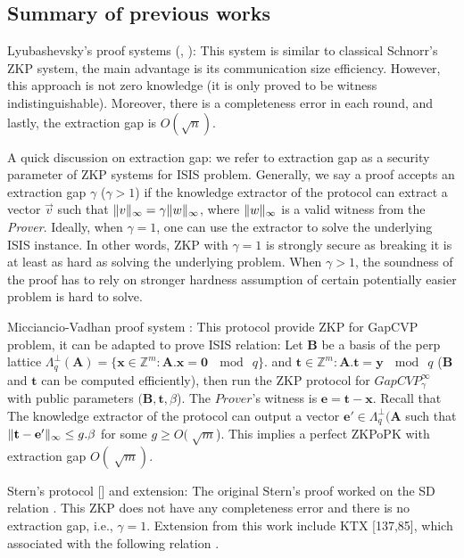 \subsection*{Summary of previous works}
\begin{description}
\item Lyubashevsky's proof systems (\cite{lyubashevsky2008lattice},
  \cite{lyubashevsky2009fiat}): This system is similar to classical Schnorr's
  ZKP system, the main advantage is its communication size efficiency. However,
  this approach is not zero knowledge (it is only proved to be witness
  indistinguishable). Moreover, there is a completeness error in each round, and
  lastly, the extraction gap is $O(\sqrt{n})$.

  A quick discussion on extraction gap: we refer to extraction gap as a security
  parameter of ZKP systems for ISIS problem. Generally, we say a proof accepts
  an extraction gap $\gamma$ ($\gamma > 1$) if the knowledge extractor of the
  protocol can extract a vector $\vec{v}$ such that
  $\Vert v \Vert_{\infty} = \gamma \Vert w \Vert_{\infty}$, where $\Vert w \Vert_{\infty}$ is a valid witness
  from the \emph{Prover}. Ideally, when $\gamma = 1$, one can use the extractor
  to solve the underlying ISIS instance. In other words, ZKP with $\gamma = 1$
  is strongly secure as breaking it is at least as hard as solving the
  underlying problem. When $\gamma > 1$, the soundness of the proof has to rely
  on stronger hardness assumption of certain potentially easier problem is hard
  to solve.
\item Micciancio-Vadhan proof system \cite{micciancio2003statistical}: This
  protocol provide ZKP for GapCVP problem, it can be adapted to prove ISIS
  relation: Let $\mathbf{B}$ be a basis of the perp lattice
  $\Lambda_q^\bot(\mathbf{A}) = \{\mathbf{x} \in \mathbb{Z}^m: \mathbf{A.x = 0}\
  \mod \ q\}$.  and $\mathbf{t} \in \mathbb{Z}^m: \mathbf{A.t = y}\ \mod \ q$
  ($\mathbf{B}$ and $\mathbf{t}$ can be computed efficiently), then run the ZKP
  protocol for $GapCVP_\gamma^\infty$ with public parameters
  $(\mathbf{B,t},\beta$). The $Prover$'s witness is $\mathbf{e = t - x}$. Recall
  that The knowledge extractor of the protocol can output a vector
  $\mathbf{e'} \in \Lambda_q^\bot( \mathbf{A}$ such that
  $\Vert \mathbf{ t - e'} \Vert_{\infty} \leq g.\beta$ for some $g \geq O(\sqrt[]
  {m}$). This implies a perfect ZKPoPK with extraction gap $O(\sqrt[]{m})$.
\item Stern's protocol [\todo{citeStern}] and extension: The original Stern's
  proof worked on the SD relation \todo{SD relation}. This ZKP does not have any
  completeness error and there is no extraction gap, i.e., $\gamma =
  1$. Extension from this work include KTX [137,85], which associated with the
  following relation \todo{ktxRelation}.


\end{description}
